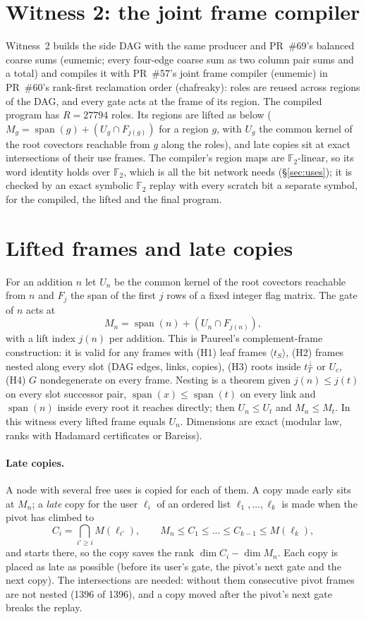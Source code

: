 \documentclass[11pt]{article}
\theoremstyle{remark}\newtheorem*{remark}{Remark}
\begin{document}
\section{Witness 2: the joint frame compiler}\label{sec:jf}
Witness~2 builds the side DAG with the same producer and PR~\#69's balanced coarse sums (eumemic; every four-edge
coarse sum as two column pair sums and a total) and compiles it with PR~\#57's joint frame compiler (eumemic) in
PR~\#60's rank-first reclamation order (chafreaky): roles are reused across regions of the DAG, and every gate acts at
the frame of its region. The compiled program has $R=27794$ roles. Its regions are lifted as below
($M_g=\operatorname{span}(g)+(U_g\cap F_{j(g)})$ for a region $g$, with $U_g$ the common kernel of the root covectors
reachable from $g$ along the roles), and late copies sit at exact intersections of their use frames. The compiler's
region maps are $\mathbb F_2$-linear, so its word identity holds over $\mathbb F_2$, which is all the bit network
needs (\S\ref{sec:uses}); it is checked by an exact symbolic $\mathbb F_2$ replay with every scratch bit a separate
symbol, for the compiled, the lifted and the final program.

\section{Lifted frames and late copies}
For an addition $n$ let $U_n$ be the common kernel of the root covectors reachable from $n$ and $F_j$ the span of
the first $j$ rows of a fixed integer flag matrix. The gate of $n$ acts at
\[ M_n=\operatorname{span}(n)+(U_n\cap F_{j(n)}), \]
with a lift index $j(n)$ per addition. This is Paureel's complement-frame construction: it is valid for any frames
with (H1) leaf frames $\langle t_S\rangle$, (H2) frames nested along every slot (DAG edges, links, copies),
(H3) roots inside $t_T^\perp$ or $U_c$, (H4) $G$ nondegenerate on every frame. Nesting is a theorem given
$j(n)\le j(t)$ on every slot successor pair, $\operatorname{span}(x)\le\operatorname{span}(t)$ on every link and
$\operatorname{span}(n)$ inside every root it reaches directly; then $U_n\le U_t$ and $M_n\le M_t$. In this witness
every lifted frame equals $U_n$. Dimensions are exact (modular law, ranks with Hadamard certificates or Bareiss).

\paragraph{Late copies.} A node with several free uses is copied for each of them. A copy made early sits at $M_n$;
a \emph{late} copy for the user $\ell_i$ of an ordered list $\ell_1,\dots,\ell_k$ is made when the pivot has climbed to
\[ C_i=\textstyle\bigcap_{i'\ge i} M(\ell_{i'}), \qquad M_n\le C_1\le\dots\le C_{k-1}\le M(\ell_k), \]
and starts there, so the copy saves the rank $\dim C_i-\dim M_n$. Each copy is placed as late as possible (before its
user's gate, the pivot's next gate and the next copy). The intersections are needed: without them consecutive pivot
frames are not nested (1396 of 1396), and a copy moved after the pivot's next gate breaks the replay.
\end{document}
